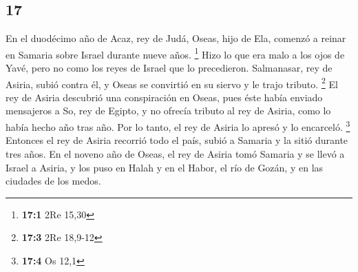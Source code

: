 \begin{paracol}{2}
\hypertarget{section-32}{%
\section{17}\label{section-32}}

 En el duodécimo año de Acaz, rey de Judá, Oseas, hijo de
Ela, comenzó a reinar en Samaria sobre Israel durante nueve años.
\footnote{\textbf{17:1} 2Re 15,30}  Hizo lo que era malo a
los ojos de Yavé, pero no como los reyes de Israel que lo precedieron.
 Salmanasar, rey de Asiria, subió contra él, y Oseas se
convirtió en su siervo y le trajo tributo. \footnote{\textbf{17:3} 2Re
  18,9-12}  El rey de Asiria descubrió una conspiración en
Oseas, pues éste había enviado mensajeros a So, rey de Egipto, y no
ofrecía tributo al rey de Asiria, como lo había hecho año tras año. Por
lo tanto, el rey de Asiria lo apresó y lo encarceló. \footnote{\textbf{17:4}
  Os 12,1}  Entonces el rey de Asiria recorrió todo el
país, subió a Samaria y la sitió durante tres años.  En el
noveno año de Oseas, el rey de Asiria tomó Samaria y se llevó a Israel a
Asiria, y los puso en Halah y en el Habor, el río de Gozán, y en las
ciudades de los medos.


\end{paracol}
